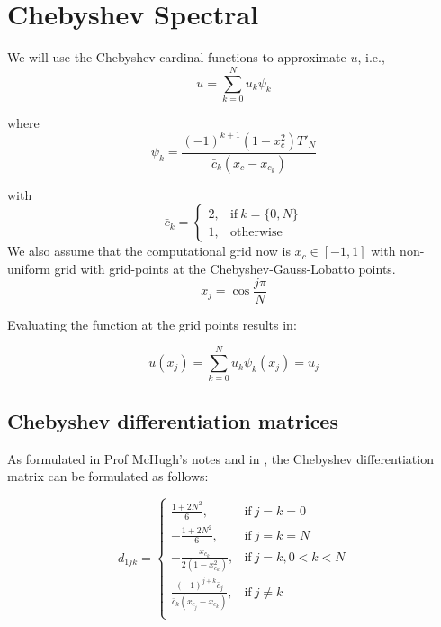 \documentclass{article}
\begin{document}
\section{Chebyshev Spectral}
We will use the Chebyshev cardinal functions to approximate $u$, i.e., $$u = \sum_{k=0}^{N} u_{k}\psi_{k} $$

where $$\psi_{k} = \frac{(-1)^{k+1}(1-x_{c}^{2})T'_{N}}{\bar{c}_{k} (x_{c}-x_{c_{k}})} $$

with $$\bar{c}_{k} =
    \begin{cases}
      2, & \text{if}\ k=\{0, N\} \\
      1, & \text{otherwise}
    \end{cases}$$
We also assume that the computational grid now is $x_{c} \in [-1, 1]$ with non-uniform grid with grid-points at the Chebyshev-Gauss-Lobatto points.
\begin{equation*}
 x_{j} = \cos{\frac{j \pi}{N}}
\end{equation*}

Evaluating the function at the grid points results in:

\begin{equation*}
 u(x_{j}) = \sum_{k=0}^{N} u_{k}\psi_{k}(x_{j}) = u_{j}
\end{equation*}

\subsection{Chebyshev differentiation matrices}
As formulated in Prof McHugh's notes and in \cite{trefethen2000spectral}, the Chebyshev differentiation matrix can be formulated as follows:

\begin{equation}
 d_{1jk} = \begin{cases}
      \frac{1+2N^{2}}{6}, & \text{if}\ j = k = 0 \\
      -\frac{1+2N^{2}}{6}, & \text{if}\ j = k = N\\
      -\frac{x_{c_{k}}}{2(1-x_{c_{k}}^{2})}, & \text{if}\ j = k, 0 < k < N \\
      \frac{(-1)^{j+k}\bar{c}_{j} }{\bar{c}_{k}(x_{c_{j}} - x_{c_{k}})}, & \text{if}\ j \neq k \\
    \end{cases}
\end{equation}
\end{document}

